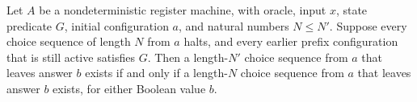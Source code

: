 \begin{lemma}
\label{Complexity.LogProg.nans_mono_len}
\leanok
{}
Let $A$ be a nondeterministic register machine, with oracle, input $x$, state predicate
$G$, initial configuration $a$, and natural numbers $N\le N'$. Suppose every choice
sequence of length $N$ from $a$ halts, and every earlier prefix configuration that is
still active satisfies $G$. Then a length-$N'$ choice sequence from $a$ that leaves
answer $b$ exists if and only if a length-$N$ choice sequence from $a$ that leaves
answer $b$ exists, for either Boolean value $b$.
\end{lemma}
